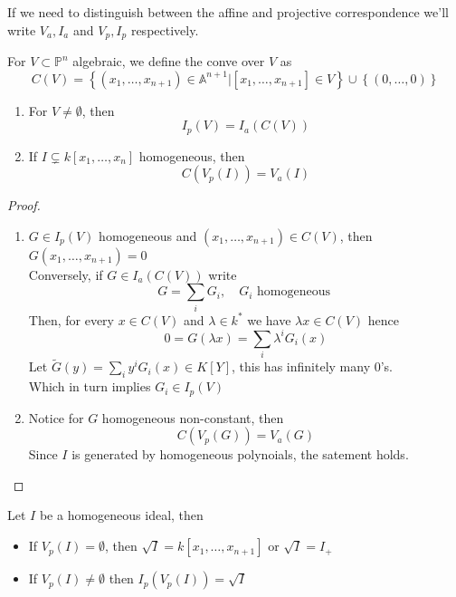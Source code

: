 \documentclass[../main.tex]{subfiles}
\begin{document}
\begin{rmq}
If we need to distinguish between the affine and projective correspondence we'll write $V_a,I_a$ and $V_p,I_p$ respectively.
\end{rmq}
\begin{defn}[Cone]
For $V \subset  \mathbb{P}^{n}$ algebraic, we define the conve over $V$ as
\[ 
C( V) = \left\{ ( x_1,\ldots,x_{n+1} ) \in \mathbb{A}^{n+1}| [ x_1,\ldots,x_{n+1} ] \in V \right\} \cup \left\{ ( 0,\ldots,0)  \right\} 
\]
	
\end{defn}
\begin{lemma}
\begin{enumerate}
\item For $V \neq \emptyset$, then
	\[ 
	I_p( V) = I_a( C( V) ) 
\]
\item If $ I \subsetneq k[x_1,\ldots,x_n]$ homogeneous, then
	\[ 
	C( V_p( I) ) = V_a( I) 
	\]
	
\end{enumerate}
\end{lemma}
\begin{proof}
\begin{enumerate}
\item $G\in I_p( V) $ homogeneous and $ ( x_1,\ldots,x_{n+1} ) \in C( V) $, then $G( x_1,\ldots,x_{n+1} ) =0$ \\
	Conversely, if $G\in I_a( C( V) ) $ write
	\[ 
	G= \sum_i G_i,\quad G_i \text{ homogeneous } 
	\]
	Then, for every $x\in C( V) $ and $\lambda\in k^{*}$ we have $ \lambda x \in C( V) $ hence
	\[ 
	0 = G( \lambda x ) = \sum_i \lambda^{i}G_i( x) 
	\]
	Let $\tilde G ( y) = \sum_{i}^{ } y^{i}G_i( x) \in K[Y]$, this has infinitely many $0$'s.\\
	Which in turn implies $G_i \in I_p( V) $ 
	

\item Notice for $G$ homogeneous non-constant, then
	\[ 
	C( V_p( G) ) = V_a( G) 
	\]
	Since $I$ is generated by homogeneous polynoials, the satement holds.
\end{enumerate}

\end{proof}
\begin{propo}
Let $I$ be a homogeneous ideal, then
\begin{itemize}
	\item If $ V_p( I) = \emptyset$, then $ \sqrt{I} = k[x_1,\ldots,x_{n+1} ]$ or $ \sqrt{I} = I_+$ 
	\item If $V_p( I) \neq \emptyset$ then $I_p( V_p( I) ) = \sqrt{I} $ 
\end{itemize}

\end{propo}
\end{document}
